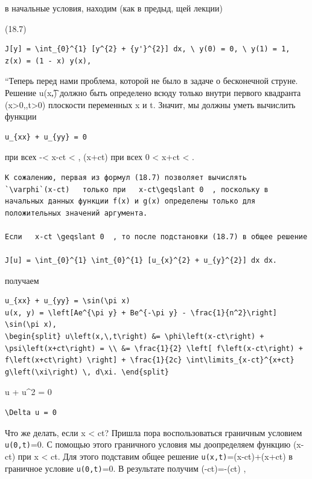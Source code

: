 \documentclass[
  ukrainian,
]{article}
\begin{document}
в начальные условия, находим (как в предыд, щей лекции)

(18.7)

\begin{verbatim}
J[y] = \int_{0}^{1} [y^{2} + {y'}^{2}] dx, \ y(0) = 0, \ y(1) = 1,
z(x) = (1 - x) y(x),
\end{verbatim}

``Теперь перед нами проблема, которой не было в задаче о бесконечной
струне. Решение u\left(x,\t\right) должно быть определено всюду только
внутри первого квадранта (x\textgreater0,,t\textgreater0) плоскости
переменных x и t. Значит, мы должны уметь вычислить функции

\begin{verbatim}
u_{xx} + u_{yy} = 0
\end{verbatim}

при всех -\infty \textless{} x-ct \textless{} \infty  , \psi(x+ct) при
всех 0 \textless{} x+ct \textless{} \infty  .

\begin{verbatim}
К сожалению, первая из формул (18.7) позволяет вычислять   `\varphi`(x-ct)   только при   x-ct\geqslant 0  , поскольку в начальных данных функции f(x) и g(x) определены только для положительных значений аргумента.

Если   x-ct \geqslant 0  , то после подстановки (18.7) в общее решение

J[u] = \int_{0}^{1} \int_{0}^{1} [u_{x}^{2} + u_{y}^{2}] dx dx.
\end{verbatim}

получаем

\begin{verbatim}
u_{xx} + u_{yy} = \sin(\pi x)
u(x, y) = \left[Ae^{\pi y} + Be^{-\pi y} - \frac{1}{n^2}\right] \sin(\pi x),
\begin{split} u\left(x,\,t\right) &= \phi\left(x-ct\right) + \psi\left(x+ct\right) = \\ &= \frac{1}{2} \left[ f\left(x-ct\right) + f\left(x+ct\right) \right] + \frac{1}{2c} \int\limits_{x-ct}^{x+ct} g\left(\xi\right) \, d\xi. \end{split}
\end{verbatim}

 u + u\^{}2 = 0

\begin{verbatim}
\Delta u = 0
\end{verbatim}

Что же делать, если x \textless{} ct? Пришла пора воспользоваться
граничным условием \texttt{u(0,t)}=0. С помощью этого граничного условия
мы доопределяем функцию \varphi(x-ct) при x \textless{} ct. Для этого
подставим общее решение \texttt{u(x,t)}=\varphi(x-ct)+\psi(x+ct) в
граничное условие \texttt{u(0,t)}=0. В результате получим
\varphi(-ct)=-\psi(ct) ,
\end{document}
